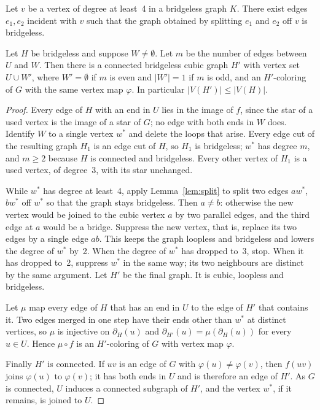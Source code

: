 \begin{lemma}\label{lem:split}
Let $v$ be a vertex of degree at least~4 in a bridgeless graph $K$. There exist edges $e_1, e_2$
incident with $v$ such that the graph obtained by splitting $e_1$ and $e_2$ off $v$ is bridgeless.
\end{lemma}

\begin{lemma}\label{lem:unused}
Let $H$ be bridgeless and suppose $W \ne \emptyset$. Let $m$ be the number of edges between $U$
and $W$. Then there is a connected bridgeless cubic graph $H'$ with vertex set $U \cup W'$, where
$W' = \emptyset$ if $m$ is even and $|W'| = 1$ if $m$ is odd, and an $H'$-coloring of $G$ with
the same vertex map $\varphi$. In particular $|V(H')| \le |V(H)|$.
\end{lemma}

\begin{proof}
Every edge of $H$ with an end in $U$ lies in the image of $f$, since the star of a used vertex is
the image of a star of $G$; no edge with both ends in $W$ does. Identify $W$ to a single vertex
$w^*$ and delete the loops that arise. Every edge cut of the resulting graph $H_1$ is an edge cut
of $H$, so $H_1$ is bridgeless; $w^*$ has degree $m$, and $m \ge 2$ because $H$ is connected and
bridgeless. Every other vertex of $H_1$ is a used vertex, of degree~3, with its star unchanged.

While $w^*$ has degree at least~4, apply Lemma~\ref{lem:split} to split two edges $aw^*$, $bw^*$
off $w^*$ so that the graph stays bridgeless. Then $a \ne b$: otherwise the new vertex would be
joined to the cubic vertex $a$ by two parallel edges, and the third edge at $a$ would be a bridge.
Suppress the new vertex, that is, replace its two edges by a single edge $ab$. This keeps the graph
loopless and bridgeless and lowers the degree of $w^*$ by~2. When the degree of $w^*$ has dropped
to~3, stop. When it has dropped to~2, suppress $w^*$ in the same way; its two neighbours are
distinct by the same argument. Let $H'$ be the final graph. It is cubic, loopless and bridgeless.

Let $\mu$ map every edge of $H$ that has an end in $U$ to the edge of $H'$ that contains it. Two
edges merged in one step have their ends other than $w^*$ at distinct vertices, so $\mu$ is
injective on $\partial_H(u)$ and $\partial_{H'}(u) = \mu(\partial_H(u))$ for every $u \in U$. Hence
$\mu \circ f$ is an $H'$-coloring of $G$ with vertex map $\varphi$.

Finally $H'$ is connected. If $uv$ is an edge of $G$ with $\varphi(u) \ne \varphi(v)$, then
$f(uv)$ joins $\varphi(u)$ to $\varphi(v)$; it has both ends in $U$ and is therefore an edge of
$H'$. As $G$ is connected, $U$ induces a connected subgraph of $H'$, and the vertex $w^*$, if it
remains, is joined to $U$.
\end{proof}

